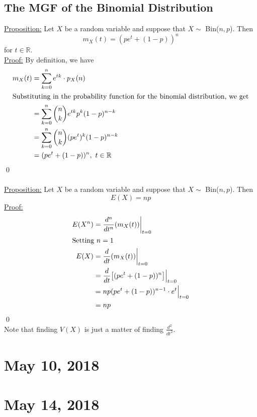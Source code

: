 \documentclass{article}
\newcommand{\R}{\mathbb{R}}
\newcommand{\x}{\cdot}
\begin{document}
\subsection{The MGF of the Binomial Distribution}
\underline{Proposition:} Let $X$ be a random variable and suppose that $X \sim$ Bin($n, p$). Then
\[m_{X}(t) = (pe^{t} + (1-p))^{n}\]
for $t \in \R$.\\
\underline{Proof:} By definition, we have
\begin{align*}
	m_{X}(t) &= \sum_{k=0}^{n} e^{tk}\x p_{X}(n)\\
	\intertext{Substituting in the probability function for the binomial distribution, we get}
			&= \sum_{k=0}^{n} {n\choose k} e^{tk}p^{k}(1-p)^{n-k}\\
			&= \sum_{k=0}^{n} {n\choose k} (pe^{t})^{k}(1-p)^{n-k}\\
			&= (pe^{t} + (1-p))^{n}, \ t\in \R
\end{align*}
\qed \\\\
\underline{Proposition:} Let $X$ be a random variable and suppose that $X \sim$ Bin($n, p$). Then
\[E(X) = np\]
\underline{Proof:} 
\begin{align*}
	E(X^{n}) &= \frac{d^{n}}{dt^{n}}(m_{X}(t))\bigg\rvert_{t=0}\\
	\intertext{Setting $n=1$}
	E(X) &= \frac{d}{dt}(m_{X}(t))\bigg\rvert_{t=0}\\
		&= \frac{d}{dt}\big[(pe^{t} + (1-p))^{n}\big] \Big\rvert_{t=0}\\
		&= np(pe^{t} + (1-p))^{n-1}\x e^{t} \Big\rvert_{t=0}\\
		&= np
\end{align*}
\qed\\
Note that finding $V(X)$ is just a matter of finding $\frac{d^{2}}{dt^{2}}$.
\newpage


\section{May 10, 2018}
\newpage


\section{May 14, 2018}
\newpage

\end{document}
